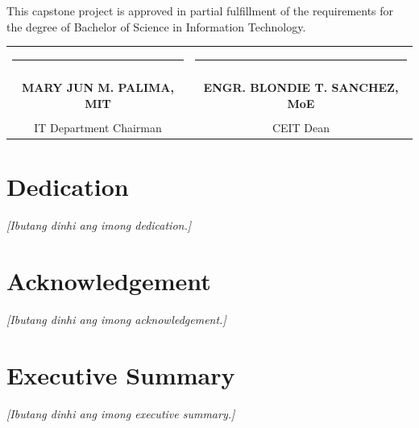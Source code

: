 \documentclass[12pt, a4paper]{report}
\begin{document}
\begin{singlespace}
\vspace{0.4cm}

This capstone project is approved in partial fulfillment of the requirements for the degree of Bachelor of Science in Information Technology.

\vspace{0.6cm}

\begin{center}
    \begin{tabular}{c c}
        \rule{7cm}{0.5pt} & \rule{7cm}{0.5pt} \\
        \vspace{0.1cm} & \vspace{0.1cm} \\
        \textbf{MARY JUN M. PALIMA, MIT} & \textbf{ENGR. BLONDIE T. SANCHEZ, MoE} \\
        \vspace{0.1cm} & \vspace{0.1cm} \\
        IT Department Chairman & CEIT Dean
    \end{tabular}
\end{center}
\end{singlespace}
\clearpage

\chapter*{Dedication}
\thispagestyle{plain}
\textit{[Ibutang dinhi ang imong dedication.]}
\clearpage

\chapter*{Acknowledgement}
\thispagestyle{plain}
\textit{[Ibutang dinhi ang imong acknowledgement.]}
\clearpage

\chapter*{Executive Summary}
\thispagestyle{plain}
\textit{[Ibutang dinhi ang imong executive summary.]}
\clearpage

\renewcommand{\contentsname}{TABLE OF CONTENTS}
\tableofcontents
\clearpage

\renewcommand{\listfigurename}{LIST OF FIGURES}
\listoffigures
\clearpage
\end{document}
